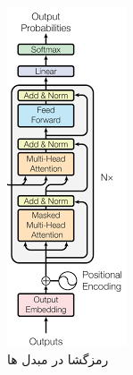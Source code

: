 \begin{figure}[h]
	\centering
	\begin{minipage}[b]{0.31\textwidth}
		\centering
		\includegraphics[width=\textwidth]{transformer_images/decoder.png}
		\caption{رمزگشا در مبدل ها}
		\label{fig:Decoder}
	\end{minipage}
	\hfill
\end{figure}


